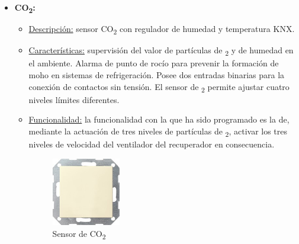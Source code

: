 \begin{itemize}
\item \textbf{CO\textsubscript{2}:} 
	\begin{itemize}
	\item\underline{Descripción:} sensor CO\textsubscript{2} con regulador de humedad y temperatura KNX.
	\item \underline{Características:} supervisión del valor de partículas de \textsubscript{2} y de humedad en el ambiente. Alarma de punto de rocío para prevenir la formación de moho en sistemas de refrigeración. Posee dos entradas binarias para la conexión de contactos sin tensión. El sensor de \textsubscript{2} permite ajustar cuatro niveles límites diferentes.
	\item \underline{Funcionalidad:} la funcionalidad con la que ha sido programado es la de, mediante la actuación de tres niveles de partículas de \textsubscript{2}, activar los tres niveles de velocidad del ventilador del recuperador en consecuencia.
	\begin{figure}[h]
	\centering
	\includegraphics[width=0.30\textwidth]{figures/sensor_co2.jpg}   
	\caption{Sensor de CO\textsubscript{2}}
	\label{fig:sensor_co2}
	\end{figure}
	\end{itemize} 



\end{itemize}
